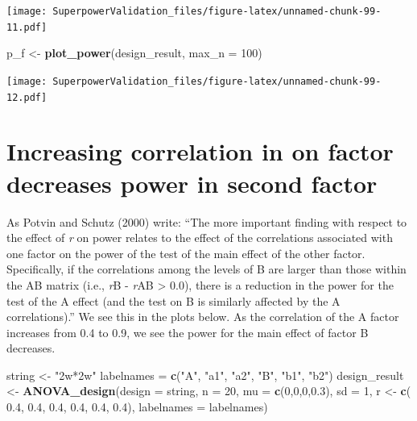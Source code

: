 \documentclass[]{book}
\newenvironment{Shaded}{\begin{snugshade}}{\end{snugshade}}
\newcommand{\DataTypeTok}[1]{\textcolor[rgb]{0.13,0.29,0.53}{#1}}
\newcommand{\DecValTok}[1]{\textcolor[rgb]{0.00,0.00,0.81}{#1}}
\newcommand{\FloatTok}[1]{\textcolor[rgb]{0.00,0.00,0.81}{#1}}
\newcommand{\KeywordTok}[1]{\textcolor[rgb]{0.13,0.29,0.53}{\textbf{#1}}}
\newcommand{\NormalTok}[1]{#1}
\newcommand{\StringTok}[1]{\textcolor[rgb]{0.31,0.60,0.02}{#1}}
\begin{document}
\texttt{[image: SuperpowerValidation\_files/figure-latex/unnamed-chunk-99-11.pdf]}

\begin{Shaded}
\begin{Highlighting}[]
\NormalTok{p_f <-}\StringTok{ }\KeywordTok{plot_power}\NormalTok{(design_result,}
                      \DataTypeTok{max_n =} \DecValTok{100}\NormalTok{)}
\end{Highlighting}
\end{Shaded}

\texttt{[image: SuperpowerValidation\_files/figure-latex/unnamed-chunk-99-12.pdf]}

\hypertarget{increasing-correlation-in-on-factor-decreases-power-in-second-factor}{%
\section{Increasing correlation in on factor decreases power in second factor}\label{increasing-correlation-in-on-factor-decreases-power-in-second-factor}}

As Potvin and Schutz (2000) write: ``The more important finding with respect to the effect of \emph{r} on power relates to the effect of the correlations associated with one factor on the power of the test of the main effect of the other factor. Specifically, if the correlations among the levels of B are larger than those within the AB matrix (i.e., \emph{r}B - \emph{r}AB \textgreater{} 0.0), there is a reduction in the power for the test of the A effect (and the test on B is similarly affected by the A correlations).''
We see this in the plots below. As the correlation of the A factor increases from 0.4 to 0.9, we see the power for the main effect of factor B decreases.

\begin{Shaded}
\begin{Highlighting}[]
\NormalTok{string <-}\StringTok{ "2w*2w"}
\NormalTok{labelnames =}\StringTok{ }\KeywordTok{c}\NormalTok{(}\StringTok{"A"}\NormalTok{, }\StringTok{"a1"}\NormalTok{, }\StringTok{"a2"}\NormalTok{, }\StringTok{"B"}\NormalTok{, }\StringTok{"b1"}\NormalTok{, }\StringTok{"b2"}\NormalTok{)}
\NormalTok{design_result <-}\StringTok{ }\KeywordTok{ANOVA_design}\NormalTok{(}\DataTypeTok{design =}\NormalTok{ string,}
                              \DataTypeTok{n =} \DecValTok{20}\NormalTok{, }
                              \DataTypeTok{mu =} \KeywordTok{c}\NormalTok{(}\DecValTok{0}\NormalTok{,}\DecValTok{0}\NormalTok{,}\DecValTok{0}\NormalTok{,}\FloatTok{0.3}\NormalTok{), }
                              \DataTypeTok{sd =} \DecValTok{1}\NormalTok{, }
\NormalTok{                              r <-}\StringTok{ }\KeywordTok{c}\NormalTok{(}
                                \FloatTok{0.4}\NormalTok{, }\FloatTok{0.4}\NormalTok{, }\FloatTok{0.4}\NormalTok{,}
                                \FloatTok{0.4}\NormalTok{, }\FloatTok{0.4}\NormalTok{,}
                                \FloatTok{0.4}\NormalTok{),}
                              \DataTypeTok{labelnames =}\NormalTok{ labelnames)}
\end{Highlighting}
\end{Shaded}
\end{document}
